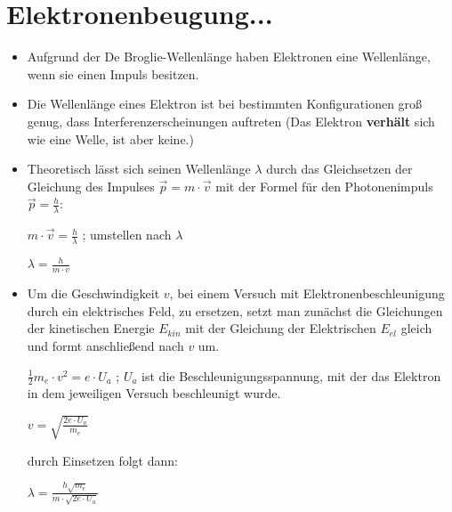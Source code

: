 \section{Elektronenbeugung...}
\begin{itemize}
\item Aufgrund der De Broglie-Wellenlänge haben Elektronen eine Wellenlänge, wenn sie einen Impuls besitzen.
\item Die Wellenlänge eines Elektron ist bei bestimmten Konfigurationen groß genug, dass Interferenzerscheinungen auftreten (Das Elektron \textbf{verhält} sich wie eine Welle, ist aber keine.)
\item Theoretisch lässt sich seinen Wellenlänge $\lambda$ durch das Gleichsetzen der Gleichung des Impulses $\vec{p}=m\cdot\vec{v}$ mit der Formel für den Photonenimpuls $\vec{p}=\frac{h}{\lambda}$:

$m\cdot\vec{v}=\frac{h}{\lambda}$  ; umstellen nach $\lambda$

$\lambda = \frac{h}{m \cdot v} $

\item Um die Geschwindigkeit $v$, bei einem Versuch mit Elektronenbeschleunigung durch ein elektrisches Feld, zu ersetzen, setzt man zunächst die Gleichungen der kinetischen Energie $E_{kin}$ mit der Gleichung der Elektrischen $E_{el}$ gleich und formt anschließend nach $v$ um.

$\frac{1}{2} m_e \cdot v^2 = e \cdot U_a$  ; $U_a$ ist die Beschleunigungsspannung, mit der das Elektron in dem jeweiligen Versuch beschleunigt wurde.

$v = \sqrt{\frac{2e \cdot U_a}{m_e}}$

durch Einsetzen folgt dann:

\Large $\lambda = \frac{h \sqrt{m_e}}{m \cdot \sqrt{2e \cdot U_a}} $
\end{itemize}

